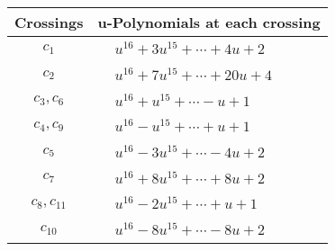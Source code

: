 \documentclass[1p]{elsarticle_modified}
\theoremstyle{definition}
\begin{document}
\begin{tabular}{m{50pt}|m{274pt}}
Crossings & \hspace{64pt}u-Polynomials at each crossing \\
\hline $$\begin{aligned}c_{1}\end{aligned}$$&$\begin{aligned}
&u^{16}+3 u^{15}+\cdots+4 u+2
\end{aligned}$\\
\hline $$\begin{aligned}c_{2}\end{aligned}$$&$\begin{aligned}
&u^{16}+7 u^{15}+\cdots+20 u+4
\end{aligned}$\\
\hline $$\begin{aligned}c_{3},c_{6}\end{aligned}$$&$\begin{aligned}
&u^{16}+u^{15}+\cdots- u+1
\end{aligned}$\\
\hline $$\begin{aligned}c_{4},c_{9}\end{aligned}$$&$\begin{aligned}
&u^{16}- u^{15}+\cdots+u+1
\end{aligned}$\\
\hline $$\begin{aligned}c_{5}\end{aligned}$$&$\begin{aligned}
&u^{16}-3 u^{15}+\cdots-4 u+2
\end{aligned}$\\
\hline $$\begin{aligned}c_{7}\end{aligned}$$&$\begin{aligned}
&u^{16}+8 u^{15}+\cdots+8 u+2
\end{aligned}$\\
\hline $$\begin{aligned}c_{8},c_{11}\end{aligned}$$&$\begin{aligned}
&u^{16}-2 u^{15}+\cdots+u+1
\end{aligned}$\\
\hline $$\begin{aligned}c_{10}\end{aligned}$$&$\begin{aligned}
&u^{16}-8 u^{15}+\cdots-8 u+2
\end{aligned}$\\
\hline
\end{tabular}\\~\\
\end{document}

